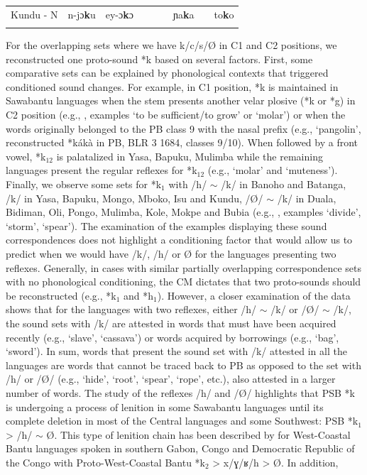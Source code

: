 \documentclass[output=paper,colorlinks,citecolor=brown
]{langscibook}
\begin{document}
\begin{table}[t]
{\begin{tabular}{lllllllll}
Kundu - N                 & n-jɔ\textbf{k}u                     & ey-ɔ\textbf{k}ɔ                &                         &                       &                            & ɲa\textbf{k}a                  &                          & to\textbf{k}o         \\ 
   \lspbottomrule
 \end{tabular}
 }
\end{table}

For the overlapping sets where we have k/c/s/Ø in C1 and C2 positions, we reconstructed one proto-sound *k based on several factors. First, some comparative sets can be explained by phonological contexts that triggered conditioned sound changes. For example, in C1 position, *k is maintained in Sawabantu languages when the stem presents another velar plosive (*k or *g) in C2 position (e.g., , examples `to be sufficient/to grow' or `molar') or when the words originally belonged to the PB class 9 \citep{hyman2019} with the nasal prefix (e.g.,  `pangolin', reconstructed *kákà in PB, BLR 3 1684, classes 9/10). When followed by a front vowel, *k$_{12}$ is palatalized in Yasa, Bapuku, Mulimba while the remaining languages present the regular reflexes for *k$_{12}$ (e.g.,  `molar' and  `muteness'). Finally, we observe some sets for *k$_1$ with /h/ $\sim$ /k/ in Banoho and Batanga, /k/ in Yasa, Bapuku, Mongo, Mboko, Isu and Kundu, /Ø/ $\sim$ /k/ in Duala, Bidiman, Oli, Pongo, Mulimba, Kole, Mokpe and Bubia (e.g., , examples `divide', `storm', `spear'). The examination of the examples displaying these sound correspondences does not highlight a conditioning factor that would allow us to predict when we would have /k/, /h/ or Ø for the languages presenting two reflexes. Generally, in cases with similar partially overlapping correspondence sets with no phonological conditioning, the CM dictates that two proto-sounds should be reconstructed (e.g., *k$_1$ and *h$_1$). However, a closer examination of the data shows that for the languages with two reflexes, either /h/ $\sim$ /k/ or /Ø/ $\sim$ /k/, the sound sets with /k/ are attested in words that must have been acquired recently (e.g., `slave', `cassava') or words acquired by borrowings (e.g., `bag', `sword'). In sum, words that present the sound set with /k/ attested in all the languages are words that cannot be traced back to PB as opposed to the set with /h/ or /Ø/ (e.g., `hide', `root', `spear', `rope', etc.), also attested in a larger number of words. The study of the reflexes /h/ and /Ø/ highlights that PSB *k is undergoing a process of lenition in some Sawabantu languages until its complete deletion in most of the Central languages and some Southwest: PSB *k$_1$ > /h/ $\sim$ Ø. This type of lenition chain has been described by \citet[12]{pacchiarottiandbostoen2022} for West-Coastal Bantu languages spoken in southern Gabon, Congo and Democratic Republic of the Congo with Proto-West-Coastal Bantu *k$_2$ > x/ɣ/ʁ/h > Ø. In addition, 
\end{document}
